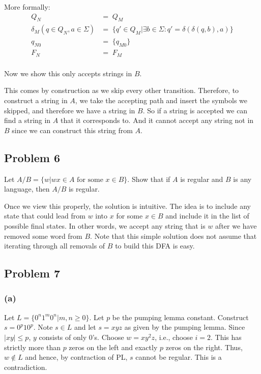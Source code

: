 \documentclass[english]{article}
\begin{document}
More formally:
\begin{align*}
                              Q_N &=\; Q_M \\
 \delta_M(q \in Q_N,a \in \Sigma) &=\; \{ q' \in Q_M | \exists b \in \Sigma : q' = \delta(\delta(q,b),a) \} \\
                           q_{N0} &=\; \{q_{M0}\} \\
                              F_N &=\; F_M \\
\end{align*}

Now we show this only accepts strings in $B$. 

This comes by construction as we skip every other transition. Therefore, to construct a string in $A$, we take the accepting path and insert the symbols we skipped, and therefore we have a string in $B$. So if a string is accepted we can find a string in $A$ that it corresponds to. And it cannot accept any string not in $B$ since we can construct this string from $A$. 

\subsection*{Problem 6}
Let $A/B = \{w|wx \in A \text{ for some } x \in B\}$. Show that if $A$ is regular and $B$ is any language, then $A/B$ is regular.

Once we view this properly, the solution is intuitive. The idea is to include any state that could lead from $w$ into $x$ for some $x \in B$ and include it in the list of possible final states. In other words, we accept any string that is $w$ after we have removed some word from $B$. Note that this simple solution does not assume that iterating through all removals of $B$ to build this DFA is easy.

\subsection*{Problem 7}
\subsubsection*{(a)}
Let $L = \{0^n 1^m 0^n | m,n \geq 0\}$. Let $p$ be the pumping lemma constant. Construct $s = 0^p 1 0^p$.
Note $s \in L$ and let $s = xyz$ as given by the pumping lemma.
Since $|xy| \leq p$, $y$ consists of only $0$'s. Choose $w = xy^2 z$, i.e., choose $i=2$. This has strictly more than $p$ zeros on the left and exactly $p$ zeros on the right. Thus, $w \notin L$ and hence, by contraction of PL, $s$ cannot be regular. This is a contradiction.
\end{document}
